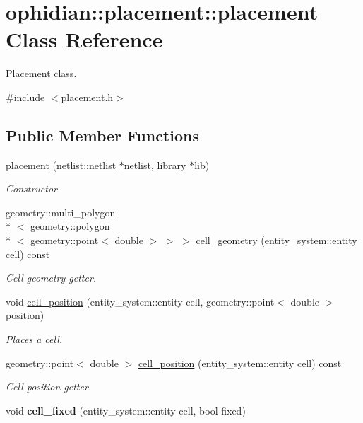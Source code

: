 \hypertarget{classophidian_1_1placement_1_1placement}{\section{ophidian\-:\-:placement\-:\-:placement Class Reference}
\label{classophidian_1_1placement_1_1placement}
}


Placement class.  




{\ttfamily \#include $<$placement.\-h$>$}

\subsection*{Public Member Functions}
\begin{DoxyCompactItemize}
\item 
\hyperlink{classophidian_1_1placement_1_1placement_a17dbf29ab5648b435f49bdeff92066fb}{placement} (\hyperlink{classophidian_1_1netlist_1_1netlist}{netlist\-::netlist} $\ast$\hyperlink{classophidian_1_1placement_1_1placement_a2e1a15ace1eb476ea2f7ce6d8d84e3c3}{netlist}, \hyperlink{classophidian_1_1placement_1_1library}{library} $\ast$\hyperlink{classophidian_1_1placement_1_1placement_a302206279c67c772dff944b9fd4d19fb}{lib})
\begin{DoxyCompactList}\small\item\em Constructor. \end{DoxyCompactList}\item 
geometry\-::multi\-\_\-polygon\\*
$<$ geometry\-::polygon\\*
$<$ geometry\-::point$<$ double $>$ $>$ $>$ \hyperlink{classophidian_1_1placement_1_1placement_a0a612df812b39e9e49ae8c25d4ea475b}{cell\-\_\-geometry} (entity\-\_\-system\-::entity cell) const 
\begin{DoxyCompactList}\small\item\em Cell geometry getter. \end{DoxyCompactList}\item 
void \hyperlink{classophidian_1_1placement_1_1placement_ab36b1998b1fbc3f3aa489479cf3f73e0}{cell\-\_\-position} (entity\-\_\-system\-::entity cell, geometry\-::point$<$ double $>$ position)
\begin{DoxyCompactList}\small\item\em Places a cell. \end{DoxyCompactList}\item 
geometry\-::point$<$ double $>$ \hyperlink{classophidian_1_1placement_1_1placement_a5b7ff09e96a0824b1cf28595a4d3e05b}{cell\-\_\-position} (entity\-\_\-system\-::entity cell) const 
\begin{DoxyCompactList}\small\item\em Cell position getter. \end{DoxyCompactList}\item 
\hypertarget{classophidian_1_1placement_1_1placement_abe4caac631153c222ff14f1119c46559}{void {\bfseries cell\-\_\-fixed} (entity\-\_\-system\-::entity cell, bool fixed)}\label{classophidian_1_1placement_1_1placement_abe4caac631153c222ff14f1119c46559}


\end{DoxyCompactItemize}
